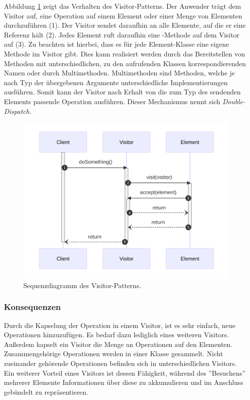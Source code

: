 Abbildung \ref{fig:visitor-seq} zeigt das Verhalten des Visitor-Patterns. Der Anwender trägt dem Visitor auf, eine Operation auf einem Element oder einer Menge von Elementen durchzuführen (1). Der Visitor sendet daraufhin  an alle Elemente, auf die er eine Referenz hält (2). Jedes Element ruft daraufhin eine -Methode auf dem Visitor auf (3). Zu beachten ist hierbei, dass es für jede Element-Klasse eine eigene Methode im Visitor gibt. Dies kann realisiert werden durch das Bereitstellen von Methoden mit unterschiedlichen, zu den aufrufenden Klassen korrespondierenden Namen oder durch Multimethoden. Multimethoden sind Methoden, welche je nach Typ der übergebenen Argumente unterschiedliche Implementierungen ausführen. Somit kann der Visitor nach Erhalt von  die zum Typ des sendenden Elements passende Operation ausführen. Dieser Mechanismus nennt sich \emph{Double-Dispatch}.

\begin{figure}[H]
	\centering
	\includegraphics[width=0.75\linewidth]{images/patterns/visitor-seq.png}
	\caption{Sequenzdiagramm des Visitor-Patterns. \cite{skobeleva_visitor_2023}}
	\label{fig:visitor-seq}
\end{figure}

\subsubsection*{Konsequenzen}
Durch die Kapselung der Operation in einem Visitor, ist es sehr einfach, neue Operationen hinzuzufügen. Es bedarf dazu lediglich eines weiteren Visitors. Außerdem kapselt ein Visitor die Menge an Operationen auf den Elementen. Zusammengehörige Operationen werden in einer Klasse gesammelt. Nicht zueinander gehörende Operationen befinden sich in unterschiedlichen Visitors. Ein weiterer Vorteil eines Visitors ist dessen Fähigkeit, während des ''Besuchens'' mehrerer Elemente Informationen über diese zu akkumulieren und im Anschluss gebündelt zu repräsentieren.


